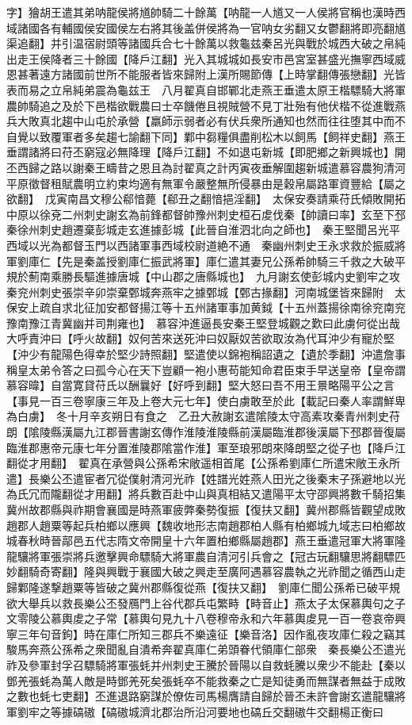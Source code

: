 字】獪胡王遣其弟呐龍侯將馗帥騎二十餘萬【呐龍一人馗又一人侯將官稱也漢時西域諸國各有輔國侯安國侯左右將其後盖併侯將為一官呐女劣翻又女鬱翻將即亮翻馗渠追翻】并引温宿尉頭等諸國兵合七十餘萬以救龜兹秦呂光與戰於城西大破之帛純出走王侯降者三十餘國【降戶江翻】光入其城城如長安市邑宮室甚盛光撫寧西域威恩甚著遠方諸國前世所不能服者皆來歸附上漢所賜節傳【上時掌翻傳張戀翻】光皆表而易之立帛純弟震為龜兹王　八月翟真自邯鄲北走燕王垂遣太原王楷驃騎大將軍農帥騎追之及於下邑楷欲戰農曰士卒饑倦且視賊營不見丁壯殆有他伏楷不從進戰燕兵大敗真北趨中山屯於承營【羸師示弱者必有伏兵衆所通知也然而往往堕其中而不自覺以致覆軍者多矣趨七諭翻下同】鄴中芻糧俱盡削松木以飼馬【飼祥史翻】燕王垂謂諸將曰苻丕窮寇必無降理【降戶江翻】不如退屯新城【即肥鄉之新興城也】開丕西歸之路以謝秦王疇昔之恩且為討翟真之計丙寅夜垂解圍趨新城遣慕容農狗清河平原徵督租賦農明立約束均適有無軍令嚴整無所侵暴由是穀帛屬路軍資豐給【屬之欲翻】　戊寅南昌文穆公郗愔薨【郗丑之翻愔挹淫翻】　太保安奏請乘苻氏傾敗開拓中原以徐兗二州刺史謝玄為前鋒都督帥豫州刺史桓石䖍伐秦【帥讀曰率】玄至下邳秦徐州刺史趙遷棄彭城走玄進據彭城【此晉自淮泗北向之師也】　秦王堅聞呂光平西域以光為都督玉門以西諸軍事西域校尉道絶不通　秦幽州刺史王永求救於振威將軍劉庫仁【先是秦盖授劉庫仁振武將軍】庫仁遣其妻兄公孫希帥騎三千救之大破平規於薊南乘勝長驅進據唐城【中山郡之唐縣城也】　九月謝玄使彭城内史劉牢之攻秦兖州刺史張崇辛卯崇棄鄄城奔燕牢之據鄄城【鄄古掾翻】河南城堡皆來歸附　太保安上疏自求北征加安都督揚江等十五州諸軍事加黄鉞【十五州蓋揚徐南徐兖南兖豫南豫江青冀幽并司荆雍也】　慕容沖進逼長安秦王堅登城觀之歎曰此虜何從出哉大呼責沖曰【呼火故翻】奴何苦來送死沖曰奴厭奴苦欲取汝為代耳沖少有寵於堅【沖少有龍陽色得幸於堅少詩照翻】堅遣使以錦袍稱詔遺之【遺於季翻】沖遣詹事稱皇太弟令答之曰孤今心在天下豈顧一袍小惠苟能知命君臣束手早送皇帝【皇帝謂慕容暐】自當寛貸苻氏以酬曩好【好呼到翻】堅大怒曰吾不用王㬌略陽平公之言【事見一百三卷寧康三年及上卷大元七年】使白虜敢至於此【載記曰秦人率謂鮮卑為白虜】　冬十月辛亥朔日有食之　乙丑大赦謝玄遣隂陵太守高素攻秦青州刺史苻朗【隂陵縣漢屬九江郡晉書謝玄傳作淮陵淮陵縣前漢屬臨淮郡後漢屬下邳郡晉復屬臨淮郡惠帝元康七年分置淮陵郡隂當作淮】軍至琅邪朗來降朗堅之從子也【降戶江翻從才用翻】　翟真在承營與公孫希宋敞遥相首尾【公孫希劉庫仁所遣宋敞王永所遣】長樂公丕遣宦者冗從僕射清河光祚【姓譜光姓燕人田光之後秦末子孫避地以光為氏冗而隴翻從才用翻】將兵數百赴中山與真相結又遣陽平太守邵興將數千騎招集冀州故郡縣與祚期會襄國是時燕軍疲弊秦勢復振【復扶又翻】冀州郡縣皆觀望成敗趙郡人趙粟等起兵柏鄉以應興【魏收地形志南趙郡柏人縣有柏鄉城九域志曰柏鄉故城春秋時晉鄗邑五代志隋文帝開皇十六年置柏鄉縣屬趙郡】燕王垂遣冠軍大將軍隆龍驤將軍張崇將兵邀擊興命驃騎大將軍農自清河引兵會之【冠古玩翻驤思將翻驃匹妙翻騎奇寄翻】隆與興戰于襄國大破之興走至廣阿遇慕容農執之光祚聞之循西山走歸鄴隆遂撃趙粟等皆破之冀州郡縣復從燕【復扶又翻】　劉庫仁聞公孫希已破平規欲大舉兵以救長樂公丕發鴈門上谷代郡兵屯繁畤【畤音止】燕太子太保慕輿句之子文零陵公慕輿䖍之子常【慕輿句見九十八卷穆帝永和六年慕輿䖍見一百一卷哀帝興寧三年句音鉤】時在庫仁所知三郡兵不樂遠征【樂音洛】因作亂夜攻庫仁殺之竊其駿馬奔燕公孫希之衆聞亂自潰希奔翟真庫仁弟頭眷代領庫仁部衆　秦長樂公丕遣光祚及參軍封孚召驃騎將軍張蚝并州刺史王騰於晉陽以自救蚝騰以衆少不能赴【秦以鄧羌張蚝為萬人敵是時鄧羌死矣張蚝卒不能救秦之亡是知徒勇而無謀者無益于成敗之數也蚝七吏翻】丕進退路窮謀於僚佐司馬楊膺請自歸於晉丕未許會謝玄遣龍驤將軍劉牢之等據碻磝【碻磝城濟北郡治所沿河要地也碻丘交翻磝牛交翻楊正衡曰